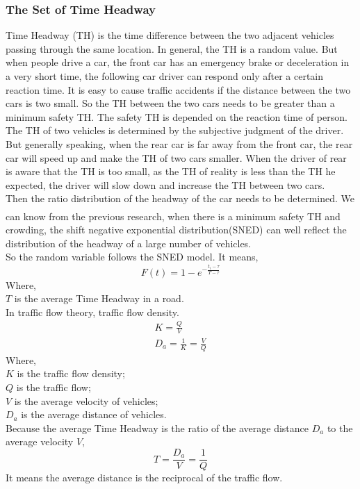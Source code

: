 \documentclass{mcmthesis}
\newcommand{\upcite}[1]{\textsuperscript{\textsuperscript{\cite{#1}}}}
\begin{document}
\subsubsection{The Set of Time Headway}
\indent Time Headway (TH) is the time difference between the two adjacent vehicles passing through the same location. In general, the TH is a random value. But when people drive a car, the front car has an emergency brake or deceleration in a very short time, the following car driver can respond only after a certain reaction time. It is easy to cause traffic accidents if the distance between the two cars is two small. So the TH between the two cars needs to be greater than a minimum safety TH. The safety TH is depended on the reaction time of person.\\
\indent The TH of two vehicles is determined by the subjective judgment of the driver. But generally speaking, when the rear car is far away from the front car, the rear car will speed up and make the TH of two cars smaller. When the driver of rear is aware that the TH is too small, as the TH of reality is less than the TH he expected, the driver will slow down and increase the TH between two cars.\\
\indent Then the ratio distribution of the headway of the car needs to be determined. We can know from the previous research\upcite{TH}, when there is a minimum safety TH and crowding, the shift negative exponential distribution(SNED) can well reflect the distribution of the headway of a large number of vehicles.\\
\indent So the random variable follows the SNED model. It means,
\begin{equation}
		F(t)=1-e^{-\frac{t_{i}-\tau }{T-\tau}}
\end{equation}
\indent Where, \\
\indent $T$ is the average Time Headway in a road.\\ 
\indent In traffic flow theory, traffic flow density.\\
\begin{equation}
\begin{split}
 K = \frac{Q}{V}\\
 D_{a}=\frac{1}{K}=\frac{V}{Q}
\end{split}
\end{equation}
\indent Where, \\
\indent $K$ is the traffic flow density;\\ 
\indent $Q$ is the traffic flow;\\
\indent $V$ is the average velocity of vehicles;\\
\indent $D_{a}$ is the average distance of vehicles.\\
\indent Because the average Time Headway is the ratio of the average distance $D_{a}$ to the average velocity $V $,\\
\begin{equation}
	T=\frac{D_{a}}{V}=\frac{1}{Q}
\end{equation}
\indent It means the average distance is the reciprocal of the traffic flow.
\end{document}

